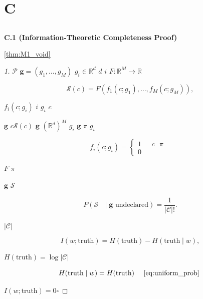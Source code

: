 \documentclass[12pt,a4paper]{article}
\theoremstyle{remark}
\newcommand{\R}{\mathbb{R}}
\newcommand{\gaugeVec}{\mathbf{g}}
\newcommand{\scoreOp}{\mathcal{S}}
\newcommand{\prizeSet}{\mathcal{P}}
\newcommand{\candidateSet}{\mathcal{C}}
\begin{document}
\newpage

\section{C}
\label{sec:appendix_math}

\subsection{}

\noindent
\textbf{C.1  (Information-Theoretic Completeness Proof)}

\ref{thm:M1_void}

\begin{proof}[1]
 $\prizeSet$  $\gaugeVec = (g_1, \dots, g_M)$ $g_i \in \R^d$  $d$  $i$  $F: \R^{M} \to \R$ 

\begin{equation}
    \scoreOp(c) = F\left(f_1(c; g_1), \dots, f_M(c; g_M)\right),
    \label{eq:committee_score}
\end{equation}

 $f_i(c; g_i)$  $i$  $g_i$  $c$ 

 $\gaugeVec$  $c$$\scoreOp(c)$  $\gaugeVec$  $(\R^d)^M$  $g_i$  $\gaugeVec$  $\pi$ $g_i$ 

\begin{equation}
    f_i(c; g_i) = \begin{cases}
        1 & \text{ $c$  $\pi$ } \\
        0 & \text{}
    \end{cases}
    \label{eq:g_attack}
\end{equation}

 $F$  $\pi$

 $\gaugeVec$ $\scoreOp$ 

\begin{equation}
    P(\scoreOp \text{ } \mid \gaugeVec \text{ undeclared}) = \frac{1}{|\candidateSet|!}.
    \label{eq:uniform_prob}
\end{equation}

 $|\candidateSet|$ 

\begin{equation}
    I(w; \text{truth}) = H(\text{truth}) - H(\text{truth} \mid w),
    \label{eq:mutual_info}
\end{equation}

 $H(\text{truth}) = \log |\candidateSet|$

\begin{equation}
    H(\text{truth} \mid w) = H(\text{truth}) \quad \text{ \ref{eq:uniform_prob} }
    \label{eq:conditional_entropy}
\end{equation}

 $I(w; \text{truth}) = 0$$\square$
\end{proof}
\end{document}
